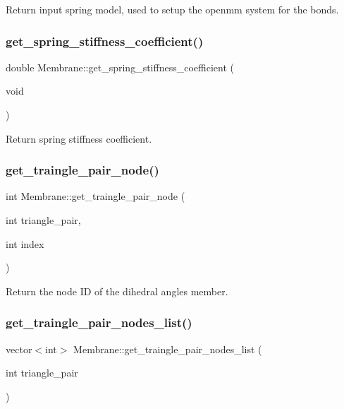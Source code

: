 Return input spring model, used to setup the openmm system for the bonds. \mbox{\label{classMembrane_a7076d2f0d0e1d39e74d35f6dbb193103}} 
\subsubsection{\texorpdfstring{get\_spring\_stiffness\_coefficient()}{get\_spring\_stiffness\_coefficient()}}
{\footnotesize\ttfamily double Membrane\+::get\+\_\+spring\+\_\+stiffness\+\_\+coefficient (\begin{DoxyParamCaption}\item[{void}]{ }\end{DoxyParamCaption})\hspace{0.3cm}{\ttfamily [inline]}}

Return spring stiffness coefficient. \mbox{\label{classMembrane_a30add8aa4bd6a4f03cdb3fd3e1b68ff9}} 
\subsubsection{\texorpdfstring{get\_traingle\_pair\_node()}{get\_traingle\_pair\_node()}}
{\footnotesize\ttfamily int Membrane\+::get\+\_\+traingle\+\_\+pair\+\_\+node (\begin{DoxyParamCaption}\item[{int}]{triangle\+\_\+pair,  }\item[{int}]{index }\end{DoxyParamCaption})\hspace{0.3cm}{\ttfamily [inline]}}

Return the node ID of the dihedral angles member. \mbox{\label{classMembrane_a6aaf6705d45dcc224eceace9670c15f9}} 
\subsubsection{\texorpdfstring{get\_traingle\_pair\_nodes\_list()}{get\_traingle\_pair\_nodes\_list()}}
{\footnotesize\ttfamily vector$<$int$>$ Membrane\+::get\+\_\+traingle\+\_\+pair\+\_\+nodes\+\_\+list (\begin{DoxyParamCaption}\item[{int}]{triangle\+\_\+pair }\end{DoxyParamCaption})\hspace{0.3cm}{\ttfamily [inline]}}

